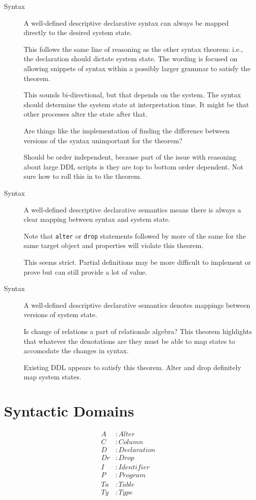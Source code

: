 \documentclass[12pt]{article}
\begin{document}
\begin{description}
  \item[Syntax] A well-defined descriptive declarative syntax can always be mapped directly to the desired system state.

    This follows the same line of reasoning as the other syntax theorem: i.e., the declaration should dictate system state. The wording is focused on allowing snippets of syntax within a possibly larger grammar to satisfy the theorem.

    This sounds bi-directional, but that depends on the system. The syntax should determine the system state at interpretation time. It might be that other processes alter the state after that.

    Are things like the implementation of finding the difference between versions of the syntax unimportant for the theorem?

    Should be order independent, because part of the issue with reasoning about large DDL scripts is they are top to bottom order dependent. Not sure how to roll this in to the theorem.

    \vspace{0.5cm}

  \item[Syntax] A well-defined descriptive declarative semantics means there is always a clear mapping between syntax and system state.

    Note that \verb|alter| or \verb|drop| statements followed by more of the same for the same target object and properties will violate this theorem.

    This seems strict. Partial definitions may be more difficult to implement or prove but can still provide a lot of value.

    \vspace{0.5cm}

  \item[Syntax] A well-defined descriptive declarative semantics denotes mappings between versions of system state.

    Is change of relations a part of relationale algebra? This theorem highlights that whatever the denotations are they must be able to map states to accomodate the changes in syntax.

    Existing DDL appears to satisfy this theorem. Alter and drop definitely map system states.
\end{description}

\section{Syntactic Domains}
\begin{align*}
  A &: Alter \\
  C &: Column \\
  D &: Declaration \\
  Dr &: Drop \\
  I &: Identifier \\
  P &: Program \\
  Ta &: Table \\
  Ty &: Type
\end{align*}
\end{document}
